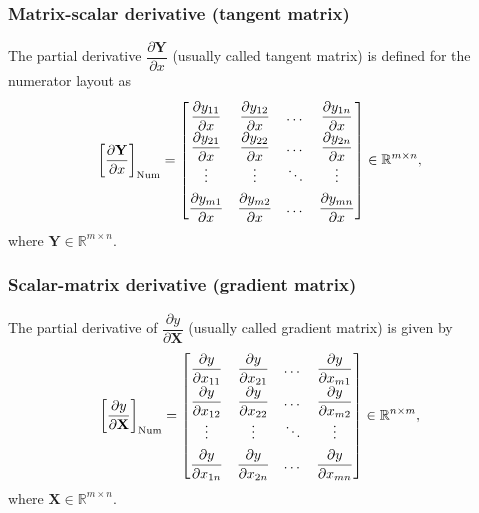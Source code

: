 \documentclass{article}
\begin{document}
\subsubsection{Matrix-scalar derivative (tangent matrix)}
The partial derivative \(\dfrac{\partial \mathbf{Y}}{\partial x}\) (usually called tangent matrix) is defined for the numerator layout as
\begin{align}
    \label{eq:tangent-num}
    \left[\dfrac{\partial \mathbf{Y}}{\partial x}\right]_{\textnormal{Num}} \renewcommand{\arraystretch}{1.8} = \begin{bmatrix}
        \dfrac{\partial y_{11}}{\partial x} & \dfrac{\partial y_{12}}{\partial x} & \dots & \dfrac{\partial y_{1n}}{\partial x} \\
        \dfrac{\partial y_{21}}{\partial x} & \dfrac{\partial y_{22}}{\partial x} & \dots & \dfrac{\partial y_{2n}}{\partial x} \\
        \vdots & \vdots & \ddots & \vdots \\
        \dfrac{\partial y_{m1}}{\partial x} & \dfrac{\partial y_{m2}}{\partial x} & \dots & \dfrac{\partial y_{mn}}{\partial x} \\
    \end{bmatrix} \in \mathbb{R}^{m \times n},
\end{align}
where \(\mathbf{Y} \in \mathbb{R}^{m \times n}\).

\subsubsection{Scalar-matrix derivative (gradient matrix)}
The partial derivative of \(\dfrac{\partial y}{\partial \mathbf{X}}\) (usually called gradient matrix) is given by
\begin{align}
    \label{eq:gradient-matrix-num}
    \renewcommand{\arraystretch}{1.8}
			\left[\dfrac{\partial y}{\partial \mathbf{X}}\right]_{\textnormal{Num}} = \begin{bmatrix}
				\dfrac{\partial y}{\partial x_{11}} & \dfrac{\partial y}{\partial x_{21}} & \dots & \dfrac{\partial y}{\partial x_{m1}} \\
				\dfrac{\partial y}{\partial x_{12}} & \dfrac{\partial y}{\partial x_{22}} & \dots & \dfrac{\partial y}{\partial x_{m2}} \\
				\vdots & \vdots & \ddots & \vdots \\
				\dfrac{\partial y}{\partial x_{1n}} & \dfrac{\partial y}{\partial x_{2n}} & \dots & \dfrac{\partial y}{\partial x_{mn}} \\
			\end{bmatrix} \in \mathbb{R}^{n \times m},
\end{align}
where \(\mathbf{X} \in \mathbb{R}^{m \times n}\).
\end{document}
